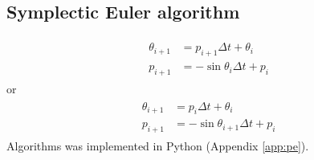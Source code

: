 \subsection{Symplectic Euler algorithm}
\begin{align}
\begin{split}
\label{al:pe-euler_s1}
\theta_{i+1} &= p_{i+1} \Delta t + \theta_i \\
p_{i+1} &= - \sin{\theta_i} \Delta t + p_i
\end{split}
\end{align}
or
\begin{align}
\begin{split}
\label{al:pe-euler_s2}
\theta_{i+1} &= p_{i} \Delta t + \theta_i \\
p_{i+1} &= - \sin{\theta_{i+1}} \Delta t + p_i
\end{split}
\end{align}
Algorithms  was implemented in Python (Appendix \ref{app:pe}).

